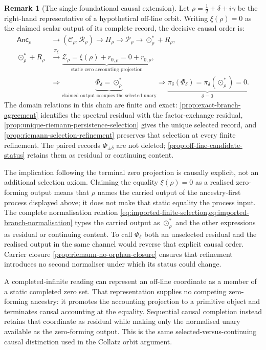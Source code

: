 \documentclass[11pt,a4paper]{article}
\theoremstyle{definition}
\newtheorem{remark}[theorem]{Remark}
\newcommand{\Cctx}{\mathcal{C}}
\newcommand{\Rres}{\mathcal{R}}
\newcommand{\Persist}{\mathcal{P}}
\begin{document}
\begin{remark}[The single foundational causal extension]
\label{rev:foundational-inference}
Let
$\rho=\tfrac12+\delta+i\gamma$ be the right-hand representative of a
hypothetical off-line orbit. Writing $\xi(\rho)=0$ as the claimed scalar
output of its complete record, the decisive causal order is:
\begin{equation}
\label{eq:foundational-inference}
\begin{aligned}
  \mathsf{Anc}_\rho
  &\longrightarrow
  (\Cctx_\rho,\Rres_\rho)
  \longrightarrow
  \Pi_\rho
  \longrightarrow
  \Persist_\rho
  \longrightarrow
  \odot_\rho^\ast+R_\rho,\\
  \odot_\rho^\ast+R_\rho
  &\overset{\pi_\xi}{\longrightarrow}
  \underbrace{
    \mathcal Z_\rho
    =\xi(\rho)+r_{0,\rho}
    =0+r_{0,\rho}
  }_{\text{static zero accounting projection}},\\
  &\Longrightarrow
  \underbrace{
    \Phi_\delta=\odot_\rho^\ast
  }_{\text{claimed output occupies the selected unary}}
  \Longrightarrow
  \underbrace{
    \pi_\delta(\Phi_\delta)
    =\pi_\delta(\odot_\rho^\ast)=0
  }_{\delta=0}.
\end{aligned}
\end{equation}
The domain relations in this chain are finite and exact:
\cref{prop:exact-branch-agreement} identifies the spectral residual with the
factor-exchange residual,
\cref{prop:unique-riemann-persistence-selection} gives the unique selected
record, and \cref{prop:riemann-selection-refinement} preserves that selection
at every finite refinement. The paired records $\Phi_{\pm\delta}$ are not
deleted; \cref{prop:off-line-candidate-status} retains them as residual or
continuing content.

The implication following the terminal zero projection is causally explicit,
not an additional selection axiom. Claiming the equality $\xi(\rho)=0$ as a
realised zero-forming output means that $\rho$ names the carried output of the
ancestry-first process displayed above; it does not make that static equality
the process input.
The complete normalisation relation
\cref{eq:imported-finite-selection,eq:imported-branch-normalisation} types the
carried output as $\odot_\rho^\ast$ and the other expressions as residual or
continuing content. To call $\Phi_\delta$ both an unselected residual and the
realised output in the same channel would reverse that explicit causal order.
Carrier closure \cref{prop:riemann-no-orphan-closure} ensures that refinement
introduces no second normaliser under which its status could change.

A completed-infinite reading can represent an off-line coordinate as a member
of a static completed zero set. That representation supplies no competing
zero-forming ancestry: it promotes the accounting projection to a primitive
object and terminates causal accounting at the equality. Sequential causal
completion instead retains that coordinate as residual while making only the
normalised unary available as the zero-forming output. This is the same
selected-versus-continuing causal distinction used in the Collatz orbit
argument.
\end{remark}
\end{document}

